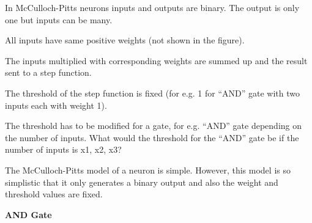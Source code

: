 	\begin{bulletedlist}
		\item In McCulloch-Pitts neurons inputs and outputs are binary. The output is only one but inputs can be many.
		\item All inputs have same positive weights (not shown in the figure).
		\item The inputs multiplied with corresponding weights are summed up and the result sent to a step function.
		\item The threshold of the step function is fixed (for e.g. 1 for ``AND'' gate with two inputs each with weight 1).
		\item The threshold has to be modified for a gate, for e.g. ``AND'' gate depending on the number of inputs.  What would the threshold for the ``AND'' gate be if the number of inputs is x1, x2, x3?
		\item The McCulloch-Pitts model of a neuron is simple. However, this model is so simplistic that it only generates a binary output and also the weight and threshold values are
fixed.
	\end{bulletedlist}


{\bfseries AND Gate}
	\begin{code}[\codenumbering]{}
		\codeitemnonumber{training\_data = [}
		\stepcodelevel{}
			\codeitemnonumber{(array([1,1]), 1), ]}
 			\prevcodelevel{}
		\stepcodelevel{}
 			\prevcodelevel{}
	\end{code}

